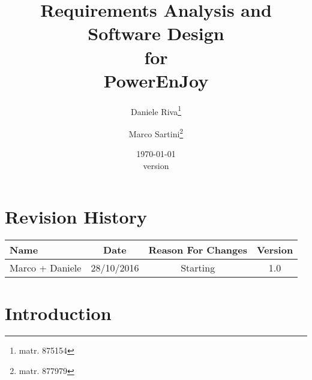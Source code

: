 \documentclass{scrreprt}
\title{Requirements Analysis and Software Design\\for\\PowerEnJoy}
\date{\today\\\bigskip version \version}
\author{Daniele Riva\thanks{matr. 875154}\and Marco Sartini\thanks{matr. 877979}}
\def\myversion{1.0 }
\begin{document}
\pagestyle{headings}
\maketitle

\begin{comment}
\begin{flushright}
    \rule{16cm}{5pt}\vskip1cm
    \begin{bfseries}
        \Huge{SOFTWARE REQUIREMENTS\\ SPECIFICATION}\\
        \vspace{1.9cm}
        for\\
        \vspace{1.9cm}
        Power EnJoy\\
        \vspace{1.5cm}
        \LARGE{Version \myversion approved}\\
        \vspace{1.5cm}
        Prepared by\\Marco Sartini (877979) and Daniele Riva (875154)\\
        \vspace{1.5cm}
        Politecnico di Milano\\
        \vspace{1.9cm}
        \today\\
    \end{bfseries}
\end{flushright}
\end{comment}

\tableofcontents


\chapter*{Revision History}

\begin{center}
    \begin{tabular}{lccc}
        \toprule
	   \textbf{ Name }& \textbf{ Date  }& \textbf{ Reason For Changes }& \textbf{ Version}\\
        \midrule
	    Marco + Daniele & 28/10/2016 & Starting & 1.0\\
	\bottomrule
    \end{tabular}
\end{center}

\chapter{Introduction}
\end{document}
